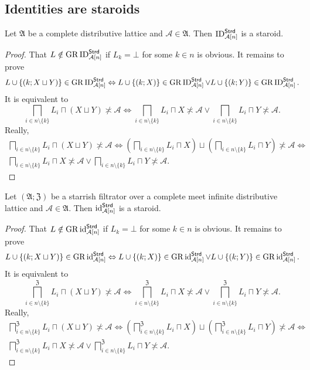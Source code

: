 \subsection{Identities are staroids}
\begin{prop}
Let $\mathfrak{A}$ be a complete distributive lattice and $\mathcal{A}\in\mathfrak{A}$.
Then $\operatorname{ID}_{\mathcal{A}[n]}^{\mathsf{Strd}}$ is a staroid.\end{prop}
\begin{proof}
That $L\notin\operatorname{GR}\operatorname{ID}_{\mathcal{A}[n]}^{\mathsf{Strd}}$ if $L_{k}=\bot$
for some $k\in n$ is obvious. It remains to prove 
\[
L\cup\{(k;X\sqcup Y)\}\in\operatorname{GR}\operatorname{ID}_{\mathcal{A}[n]}^{\mathsf{Strd}}\Leftrightarrow L\cup\{(k;X)\}\in\operatorname{GR}\operatorname{ID}_{\mathcal{A}[n]}^{\mathsf{Strd}}\vee L\cup\{(k;Y)\}\in\operatorname{GR}\operatorname{ID}_{\mathcal{A}[n]}^{\mathsf{Strd}}.
\]
It is equivalent to 
\[
\bigsqcap_{i\in n\setminus\{k\}}L_{i}\sqcap(X\sqcup Y)\nasymp\mathcal{A}\Leftrightarrow\bigsqcap_{i\in n\setminus\{k\}}L_{i}\sqcap X\nasymp\mathcal{A}\vee\bigsqcap_{i\in n\setminus\{k\}}L_{i}\sqcap Y\nasymp\mathcal{A}.
\]
Really, 
\begin{multline*}
\bigsqcap_{i\in n\setminus\{k\}}L_{i}\sqcap(X\sqcup Y)\nasymp\mathcal{A}\Leftrightarrow\left(\bigsqcap_{i\in n\setminus\{k\}}L_{i}\sqcap X\right)\sqcup\left(\bigsqcap_{i\in n\setminus\{k\}}L_{i}\sqcap Y\right)\nasymp\mathcal{A}\Leftrightarrow\\
\bigsqcap_{i\in n\setminus\{k\}}L_{i}\sqcap X\nasymp\mathcal{A}\vee\bigsqcap_{i\in n\setminus\{k\}}L_{i}\sqcap Y\nasymp\mathcal{A}.
\end{multline*}
\end{proof}
\begin{prop}
Let $(\mathfrak{A};\mathfrak{Z})$ be a starrish filtrator over a
complete meet infinite distributive lattice and $\mathcal{A}\in\mathfrak{A}$.
Then $\operatorname{id}_{\mathcal{A}[n]}^{\mathsf{Strd}}$ is a staroid.\end{prop}
\begin{proof}
That $L\notin\operatorname{GR}\operatorname{id}_{\mathcal{A}[n]}^{\mathsf{Strd}}$ if $L_{k}=\bot$
for some $k\in n$ is obvious. It remains to prove 
\[
L\cup\{(k;X\sqcup Y)\}\in\operatorname{GR}\operatorname{id}_{\mathcal{A}[n]}^{\mathsf{Strd}}\Leftrightarrow L\cup\{(k;X)\}\in\operatorname{GR}\operatorname{id}_{\mathcal{A}[n]}^{\mathsf{Strd}}\vee L\cup\{(k;Y)\}\in\operatorname{GR}\operatorname{id}_{\mathcal{A}[n]}^{\mathsf{Strd}}.
\]
It is equivalent to 
\[
\bigsqcap_{i\in n\setminus\{k\}}^{\mathfrak{Z}}L_{i}\sqcap(X\sqcup Y)\nasymp\mathcal{A}\Leftrightarrow\bigsqcap_{i\in n\setminus\{k\}}^{\mathfrak{Z}}L_{i}\sqcap X\nasymp\mathcal{A}\vee\bigsqcap_{i\in n\setminus\{k\}}^{\mathfrak{Z}}L_{i}\sqcap Y\nasymp\mathcal{A}.
\]
Really,
\begin{multline*}
\bigsqcap_{i\in n\setminus\{k\}}^{\mathfrak{Z}}L_{i}\sqcap(X\sqcup Y)\nasymp\mathcal{A}\Leftrightarrow\left(\bigsqcap_{i\in n\setminus\{k\}}^{\mathfrak{Z}}L_{i}\sqcap X\right)\sqcup\left(\bigsqcap_{i\in n\setminus\{k\}}^{\mathfrak{Z}}L_{i}\sqcap Y\right)\nasymp\mathcal{A}\Leftrightarrow\\
\bigsqcap_{i\in n\setminus\{k\}}^{\mathfrak{Z}}L_{i}\sqcap X\nasymp\mathcal{A}\vee\bigsqcap_{i\in n\setminus\{k\}}^{\mathfrak{Z}}L_{i}\sqcap Y\nasymp\mathcal{A}.
\end{multline*}
\end{proof}
